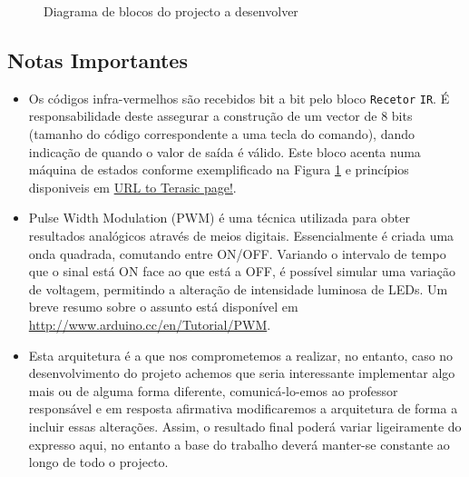 \documentclass[a4paper,11pt,openright,oneside]{report}
\begin{document}
\begin{figure}[ht]
\center
{}
\caption{Diagrama de blocos do projecto a desenvolver}
\label{fig:ir_leds2}
\end{figure}

\subsection{Notas Importantes}

\begin{itemize}
\item Os códigos infra-vermelhos são recebidos bit a bit pelo bloco \verb|Recetor| \verb|IR|. É responsabilidade deste assegurar a construção de um vector de 8 bits (tamanho do código correspondente a uma tecla do comando), dando indicação de quando o valor de saída é válido. Este bloco acenta numa máquina de estados conforme exemplificado na Figura \ref{fig:ir_leds2} e princípios disponiveis em \url{URL to Terasic page!}.
\item Pulse Width Modulation (PWM) é uma técnica utilizada para obter resultados analógicos através de meios digitais. Essencialmente é criada uma onda quadrada, comutando entre ON/OFF. Variando o intervalo de tempo que o sinal está ON face ao que está a OFF, é possível simular uma variação de voltagem, permitindo a alteração de intensidade luminosa de LEDs. Um breve resumo sobre o assunto está disponível em \url{http://www.arduino.cc/en/Tutorial/PWM}.
\item Esta arquitetura é a que nos comprometemos a realizar, no entanto, caso no desenvolvimento do projeto achemos que seria interessante implementar algo mais ou de alguma forma diferente, comunicá-lo-emos ao professor responsável e em resposta afirmativa modificaremos a arquitetura de forma a incluir essas alterações. Assim, o resultado final poderá variar ligeiramente do expresso aqui, no entanto a base do trabalho deverá manter-se constante ao longo de todo o projecto.
\end{itemize}
\end{document}

